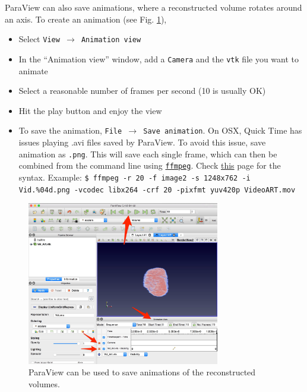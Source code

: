 \documentclass[11pt]{scrartcl}
\begin{document}
ParaView can also save animations, where a reconstructed volume rotates around an axis. To create an animation (see Fig. \ref{fig:PW_animation}), 

\begin{itemize}
    \item Select {\texttt{View $\rightarrow$ Animation view}}
    \item In the ``Animation view'' window, add a {\texttt{Camera}} and the {\texttt{vtk}} file you want to animate
    \item Select a reasonable number of frames per second (10 is usually {\footnotesize{OK}})
    \item Hit the play button and enjoy the view
    \item To save the animation, {\texttt{File $\rightarrow$ Save animation}}. \danger On {\footnotesize{OSX}}, Quick Time has issues playing .avi files saved by ParaView. To avoid this issue, save animation as {\texttt{.png}}. This will save each single frame, which can then be combined from the command line using \href{http://www.ffmpeg.org/download.html}{\texttt{ffmpeg}}. Check \href{http://hamelot.io/visualization/using-ffmpeg-to-convert-a-set-of-images-into-a-video/}{this} page for the syntax. Example: {\texttt{\$ ffmpeg -r 20 -f image2 -s 1248x762 -i Vid.\%04d.png -vcodec libx264 -crf 20 -pix\textunderscore fmt yuv420p Video\textunderscore ART.mov}}
\end{itemize}

\begin{figure}[h]
    \centering
    \includegraphics[width=0.75\textwidth]{Animation.png}
    \caption{ParaView can be used to save animations of the reconstructed volumes.}
    \label{fig:PW_animation}
\end{figure}
\end{document}

